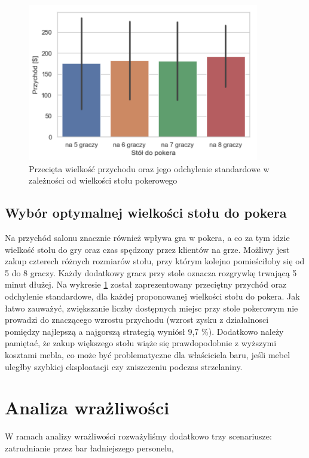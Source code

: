 \documentclass[12pt, a4paper, oneside]{mwart} %
\begin{document}
\begin{figure}
\centering
\caption{Przecięta wielkość przychodu oraz jego odchylenie standardowe w zależności od wielkości stołu pokerowego}
\label{wyk_poker}
\includegraphics[width = 0.9\textwidth]{wykresy/poker.pdf}
\end{figure}

\subsection{Wybór optymalnej wielkości stołu do pokera}
Na przychód salonu znacznie również wpływa gra w pokera, a co za tym idzie wielkość stołu do gry oraz czas spędzony przez klientów na grze. Możliwy jest zakup czterech różnych rozmiarów stołu, przy którym kolejno pomieściłoby się od 5 do 8 graczy. Każdy dodatkowy gracz przy stole oznacza rozgrywkę trwającą 5 minut dłużej. Na wykresie \ref{wyk_poker} został zaprezentowany przeciętny przychód oraz odchylenie standardowe, dla każdej proponowanej wielkości stołu do pokera. Jak łatwo zauważyć, zwiększanie liczby dostępnych miejsc przy stole pokerowym nie prowadzi do znaczącego wzrostu przychodu (wzrost zysku z działalnosci pomiędzy najlepszą a najgorszą strategią wyniósł 9,7 \%). Dodatkowo należy pamiętać, że zakup większego stołu wiąże się prawdopodobnie z wyższymi kosztami mebla, co może być problematyczne dla właściciela baru, jeśli mebel uległby szybkiej eksploatacji czy zniszczeniu podczas strzelaniny.


\section{Analiza wrażliwości}
W ramach analizy wrażliwości rozważyliśmy dodatkowo trzy scenariusze: zatrudnianie przez bar ładniejszego personelu,
\end{document}
